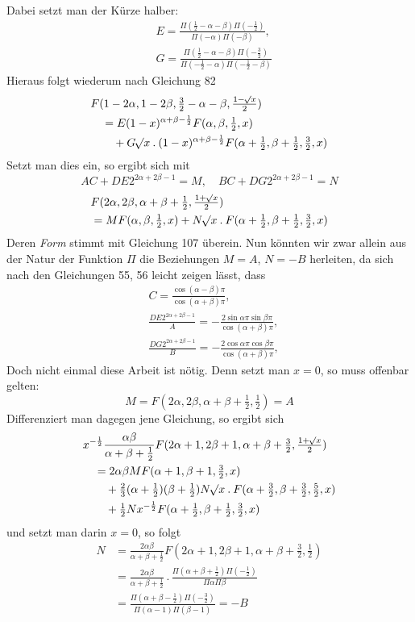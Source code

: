 Dabei setzt man der Kürze halber:
\[
\begin{aligned}&E=\frac{\Pi(\tfrac12-\alpha-\beta)\Pi(-\tfrac12)}{\Pi(-\alpha)\Pi(-\beta)},\\&
G=\frac{\Pi(\tfrac12-\alpha-\beta)\Pi(-\tfrac32)}{\Pi(-\tfrac12-\alpha)\Pi(-\tfrac12-\beta)}\end{aligned}
\]
Hieraus folgt wiederum nach Gleichung 82
\[
\begin{aligned}
&F(1-2\alpha,1-2\beta,\tfrac32-\alpha-\beta,\tfrac{1-\mathord{{}^{}\!\surd}x}2)\\
&\quad=E(1-x)^{\alpha+\beta-\frac12}F(\alpha,\beta,\tfrac12,x)\\&\qquad+G\mathord{{}^{}\!\surd}x\mathbin{.}(1-x)^{\alpha+\beta-\frac12}F(\alpha+\tfrac12,\beta+\tfrac12,\tfrac32,x)
\end{aligned}
\]
Setzt man dies ein, so ergibt sich mit
\[
AC+DE2^{2\alpha+2\beta-1}=M,\quad BC+DG2^{2\alpha+2\beta-1}=N
\]
\[
\begin{aligned}&F(2\alpha,2\beta,\alpha+\beta+\tfrac12,\tfrac{1+\mathord{{}^{}\!\surd}x}2)\\&=MF(\alpha,\beta,\tfrac12,x)+N\mathord{{}^{}\!\surd}x\mathbin{.}F(\alpha+\tfrac12,\beta+\tfrac12,\tfrac32,x)\end{aligned}
\]
Deren \textit{Form} stimmt mit Gleichung 107 überein. Nun könnten wir zwar allein aus der Natur der Funktion $\Pi$ die Beziehungen $M=A$, $N=-B$ herleiten, da sich nach den Gleichungen 55, 56 leicht zeigen lässt, dass
\[
\begin{aligned}&C=\frac{\cos(\alpha-\beta)\pi}{\cos(\alpha+\beta)\pi},\\&
\frac{DE2^{2\alpha+2\beta-1}}A=-\frac{2\sin\alpha\pi\sin\beta\pi}{\cos(\alpha+\beta)\pi},\\&
\frac{DG2^{2\alpha+2\beta-1}}B=-\frac{2\cos\alpha\pi\cos\beta\pi}{\cos(\alpha+\beta)\pi},\end{aligned}
\]
Doch nicht einmal diese Arbeit ist nötig. Denn setzt man $x=0$, so muss offenbar gelten:
\[
M=F(2\alpha,2\beta,\alpha+\beta+\tfrac12,\tfrac12)=A
\]
Differenziert man dagegen jene Gleichung, so ergibt sich
\[
\begin{aligned}
&x^{-\frac12}\frac{\alpha\beta}{\alpha+\beta+\tfrac12}F(2\alpha+1,2\beta+1,\alpha+\beta+\tfrac32,\tfrac{1+\mathord{{}^{}\!\surd}x}2)\\
&\quad=2\alpha\beta MF(\alpha+1,\beta+1,\tfrac32,x)\\
&\qquad+\tfrac23(\alpha+\tfrac12)(\beta+\tfrac12)N\mathord{{}^{}\!\surd}x\mathbin{.}F(\alpha+\tfrac32,\beta+\tfrac32,\tfrac52,x)\\&\qquad+\tfrac12Nx^{-\frac12}F(\alpha+\tfrac12,\beta+\tfrac12,\tfrac32,x)
\end{aligned}
\]
und setzt man darin $x=0$, so folgt
\[
\begin{aligned}
N&=\frac{2\alpha\beta}{\alpha+\beta+\tfrac12}F(2\alpha+1,2\beta+1,\alpha+\beta+\tfrac32,\tfrac12)\\
&=\frac{2\alpha\beta}{\alpha+\beta+\tfrac12}\mathbin{.}\frac{\Pi(\alpha+\beta+\tfrac12)\Pi(-\tfrac12)}{\Pi\alpha\Pi\beta}\\
&=\frac{\Pi(\alpha+\beta-\tfrac12)\Pi(-\tfrac32)}{\Pi(\alpha-1)\Pi(\beta-1)}=-B
\end{aligned}
\]
